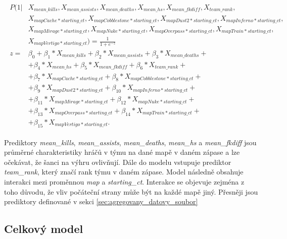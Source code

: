 \begin{align}
    \begin{split}
        P(1 | &X_{mean\_kills}, X_{mean\_assists}, X_{mean\_deaths}, X_{mean\_hs}, X_{mean\_fkdiff}, X_{team\_rank}, \\
              &X_{mapCache*starting\_ct}, X_{mapCobblestone*starting\_ct}, X_{mapDust2*starting\_ct}, X_{mapInferno*starting\_ct}, \\
              &X_{mapMirage*starting\_ct}, X_{mapNuke*starting\_ct}, X_{mapOverpass*starting\_ct}, X_{mapTrain*starting\_ct}, \\
              &X_{mapVertigo*starting\_ct}) = \frac{1}{1 + e^{-z}} \\
        z = &\beta_0 + \beta_1*X_{mean\_kills} + \beta_2*X_{mean\_assists} + \beta_3*X_{mean\_deaths} + \\
            &+ \beta_4*X_{mean\_hs} + \beta_5*X_{mean\_fkdiff} + \beta_6*X_{team\_rank} + \\
            &+ \beta_7*X_{mapCache*starting\_ct} + \beta_8*X_{mapCobblestone*starting\_ct} + \\
            &+ \beta_9*X_{mapDust2*starting\_ct} +\beta_{10}*X_{mapInferno*starting\_ct} + \\
            &+ \beta_{11}*X_{mapMirage*starting\_ct} + \beta_{12}*X_{mapNuke*starting\_ct} + \\
            &+ \beta_{13}*X_{mapOverpass*starting\_ct} + \beta_{14}*X_{mapTrain*starting\_ct} + \\
            &+ \beta_{15}*X_{mapVertigo*starting\_ct}.
    \end{split}
\end{align}

Prediktory \textit{mean\_kills}, \textit{mean\_assists}, \textit{mean\_deaths}, \textit{mean\_hs} a  \textit{mean\_fkdiff} jsou průměrné charakteristiky hráčů v týmu na dané mapě
v daném zápase a lze očekávat, že šanci na výhru ovlivňují. Dále do modelu vstupuje prediktor \textit{team\_rank}, který značí rank týmu v daném zápase. Model následně
obsahuje interakci mezi proměnnou \textit{map} a \textit{starting\_ct}. Interakce se objevuje zejména z toho důvodu, že vliv počáteční strany může být na každé mapě jiný.
Přesněji jsou prediktory
definované v sekci \ref{sec:agregovany_datovy_soubor}

\subsection{Celkový model}

